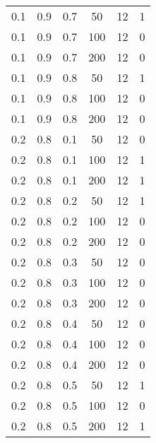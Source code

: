 \begin{table}[h]
\begin{center}
\begin{threeparttable}
\begin{tabular}{|c|c|c|c|c|c|}
   \hline
	0.1 &  0.9 &  0.7 &   50 &    12 &     1 \\
	0.1 &  0.9 &  0.7 &  100 &    12 &     0 \\
	0.1 &  0.9 &  0.7 &  200 &    12 &     0 \\
   \hline
	0.1 &  0.9 &  0.8 &   50 &    12 &     1 \\
	0.1 &  0.9 &  0.8 &  100 &    12 &     0 \\
	0.1 &  0.9 &  0.8 &  200 &    12 &     0 \\
   \hline
	0.2 &  0.8 &  0.1 &   50 &    12 &     0 \\
	0.2 &  0.8 &  0.1 &  100 &    12 &     1 \\
	0.2 &  0.8 &  0.1 &  200 &    12 &     1 \\
   \hline
	0.2 &  0.8 &  0.2 &   50 &    12 &     1 \\
	0.2 &  0.8 &  0.2 &  100 &    12 &     0 \\
	0.2 &  0.8 &  0.2 &  200 &    12 &     0 \\
   \hline
	0.2 &  0.8 &  0.3 &   50 &    12 &     0 \\
	0.2 &  0.8 &  0.3 &  100 &    12 &     0 \\
	0.2 &  0.8 &  0.3 &  200 &    12 &     0 \\
   \hline
	0.2 &  0.8 &  0.4 &   50 &    12 &     0 \\
	0.2 &  0.8 &  0.4 &  100 &    12 &     0 \\
	0.2 &  0.8 &  0.4 &  200 &    12 &     0 \\
   \hline
	0.2 &  0.8 &  0.5 &   50 &    12 &     1 \\
	0.2 &  0.8 &  0.5 &  100 &    12 &     0 \\
	0.2 &  0.8 &  0.5 &  200 &    12 &     1 \\ \hline

 		\end{tabular}
        \end{threeparttable}
	\end{center}
\end{table}
